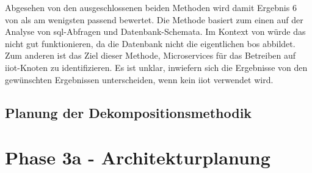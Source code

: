 Abgesehen von den ausgeschlossenen beiden Methoden wird damit Ergebnis 6 von  als am wenigsten passend bewertet.
Die Methode basiert zum einen auf der Analyse von \gls{sql}-Abfragen und Datenbank-Schemata.
Im Kontext von \jf würde das nicht gut funktionieren, da die Datenbank nicht die eigentlichen \glspl{bo} abbildet.
Zum anderen ist das Ziel dieser Methode, Microservices für das Betreiben auf \gls{iiot}-Knoten zu identifizieren.
Es ist unklar, inwiefern sich die Ergebnisse von den gewünschten Ergebnissen unterscheiden, wenn kein \gls{iiot} verwendet wird.

\subsection{Planung der Dekompositionsmethodik}

\section{Phase 3a - Architekturplanung}
\label{sec:durchführung-phase3}
